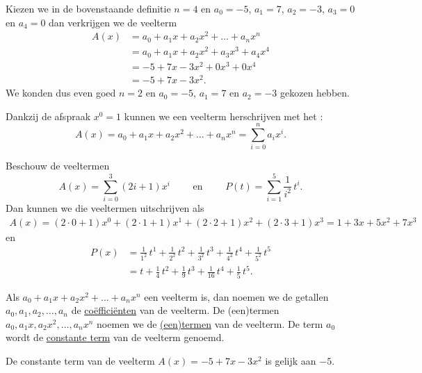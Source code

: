 \documentclass{ximera}
\begin{document}
\begin{voorbeeld}
Kiezen we in de bovenstaande definitie $n = 4$ en $a_0 = -5$, $a_1 = 7$, $a_2 = -3$, $a_3 = 0$ en $a_4 = 0$ dan verkrijgen we de veelterm
\begin{align*}
A(x) 
& = a_0 + a_1x + a_2x^2 + \dots + a_n x^n \\
& = a_0 + a_1x + a_2x^2 + a_3 x^3 + a_4 x^4 \\ 
& = -5 + 7x - 3x^2 + 0x^3 + 0x^4 \\
& = -5 + 7x - 3x^2.
\end{align*}
We konden dus even goed $n = 2$ en $a_0 = -5$, $a_1 = 7$ en $a_2 = -3$ gekozen hebben. 
\end{voorbeeld}

Dankzij de afspraak $x^0 = 1$ kunnen we een veelterm herschrijven met het :
\[
A(x) = a_0 + a_1x + a_2x^2 + \dots + a_n x^n = \sum_{i=0}^n a_i x^i.
\]

\begin{voorbeeld}
Beschouw de veeltermen
\[
A(x) = \sum_{i=0}^3 (2i+1) x^i \qquad \text{ en } \qquad P(t) = \sum_{i=1}^5 \frac{1}{i^2} \, t^i.
\] 
Dan kunnen we die veeltermen uitschrijven als
\begin{align*}
A(x)  = (2\cdot0+1)x^0 + (2\cdot1+1)x^1 + (2\cdot2+1)x^2 + (2\cdot3+1)x^3 = 1 + 3x + 5x^2 + 7x^3
\end{align*}
en
\begin{align*}
P(x) 
& = \frac{1}{1^2} \, t^1 + \frac{1}{2^2} \, t^2 + \frac{1}{3^2} \, t^3 + \frac{1}{4^2} \, t^4 + \frac{1}{5^2} \, t^5 \\
& = t + \frac{1}{4}\,t^2 + \frac{1}{9}\,t^3 + \frac{1}{16}\,t^4 + \frac{1}{5}\,t^5.
\end{align*}
\end{voorbeeld}

Als $a_0 + a_1x + a_2x^2 + \dots + a_n x^n$ een veelterm is, dan noemen we de getallen $a_0, a_1, a_2, \ldots, a_n$ de \underline{co\"effici\"enten} van de veelterm. De (een)termen $a_0, a_1x, a_2x^2, \ldots , a_nx^n$ noemen we de \underline{(een)termen} van de veelterm. De term $a_0$ wordt de \underline{constante term} van de veelterm genoemd.

\begin{voorbeeld}
De constante term van de veelterm $A(x) = -5 + 7x - 3x^2$ is gelijk aan $-5$.  
\end{voorbeeld}
\end{document}
